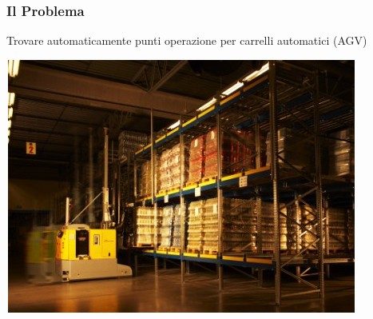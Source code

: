 \documentclass{beamer}
\begin{document}
\maketitle

\begin{frame}
	\frametitle{Il Problema}
	\vskip 0.4cm
	\begin{center}
		\begin{huge}
			Trovare automaticamente punti operazione per carrelli automatici (AGV)
		\end{huge}
	\end{center}
\vskip 0.4cm
\begin{center}
	\includegraphics[scale=0.5]{Img/LGV/op}
\end{center}
\end{frame}
\end{document}
